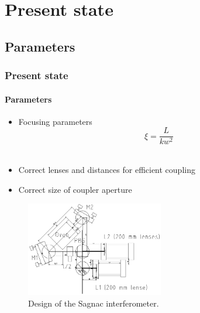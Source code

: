 \documentclass[serif,8pt]{beamer}
\begin{document}
\section{Present state}

\subsection{Parameters}
\begin{frame}[t]
	\frametitle{Present state}
	\framesubtitle{Parameters}
		\begin{itemize}
			\item Focusing parameters \cite{bennik}
					\begin{equation*}
							\xi = \frac{L}{k w^2}
						\label{eq:Focusing parameter}
					\end{equation*}\\
			\item Correct lenses and distances for efficient coupling
			\item Correct size of coupler aperture
		\end{itemize}

	\begin{figure}[!ht]
	  \centering
	  \includegraphics[width=6cm]{SagnacDesign.png}
	  \caption{Design of the Sagnac interferometer.}
	\end{figure}
\end{frame}
\end{document}
